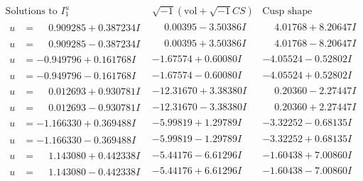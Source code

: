 \documentclass[1p]{elsarticle_modified}
\theoremstyle{definition}
\newcommand{\I}{\sqrt{-1}}
\begin{document}
$$\begin{array}{c|c|c}  
\text{Solutions to }I^u_{1}& \I (\text{vol} + \sqrt{-1}CS) & \text{Cusp shape}\\
 \hline 
\begin{aligned}
u &= \phantom{-}0.909285 + 0.387234 I\end{aligned}
 & \phantom{-}0.00395 - 3.50386 I & \phantom{-}4.01768 + 8.20647 I \\ \hline\begin{aligned}
u &= \phantom{-}0.909285 - 0.387234 I\end{aligned}
 & \phantom{-}0.00395 + 3.50386 I & \phantom{-}4.01768 - 8.20647 I \\ \hline\begin{aligned}
u &= -0.949796 + 0.161768 I\end{aligned}
 & -1.67574 + 0.60080 I & -4.05524 - 0.52802 I \\ \hline\begin{aligned}
u &= -0.949796 - 0.161768 I\end{aligned}
 & -1.67574 - 0.60080 I & -4.05524 + 0.52802 I \\ \hline\begin{aligned}
u &= \phantom{-}0.012693 + 0.930781 I\end{aligned}
 & -12.31670 + 3.38380 I & \phantom{-}0.20360 - 2.27447 I \\ \hline\begin{aligned}
u &= \phantom{-}0.012693 - 0.930781 I\end{aligned}
 & -12.31670 - 3.38380 I & \phantom{-}0.20360 + 2.27447 I \\ \hline\begin{aligned}
u &= -1.166330 + 0.369488 I\end{aligned}
 & -5.99819 + 1.29789 I & -3.32252 - 0.68135 I \\ \hline\begin{aligned}
u &= -1.166330 - 0.369488 I\end{aligned}
 & -5.99819 - 1.29789 I & -3.32252 + 0.68135 I \\ \hline\begin{aligned}
u &= \phantom{-}1.143080 + 0.442338 I\end{aligned}
 & -5.44176 - 6.61296 I & -1.60438 + 7.00860 I \\ \hline\begin{aligned}
u &= \phantom{-}1.143080 - 0.442338 I\end{aligned}
 & -5.44176 + 6.61296 I & -1.60438 - 7.00860 I \\ \hline\begin{aligned}

\end{aligned}
\end{array}$$
\end{document}
